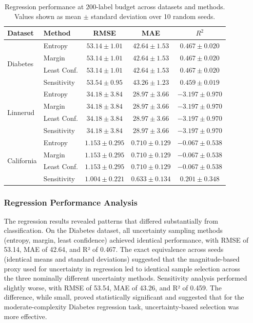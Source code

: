 \documentclass[conference]{IEEEtran}
\begin{document}
\begin{table}[t]
\centering
\caption{Regression performance at 200-label budget across datasets and methods. Values shown as mean $\pm$ standard deviation over 10 random seeds.}
\label{tab:reg-results}
\begin{tabular}{llccc}
\toprule
Dataset & Method & RMSE & MAE & $R^2$ \\
\midrule
\multirow{4}{*}{Diabetes} & Entropy & $53.14 \pm 1.01$ & $42.64 \pm 1.53$ & $0.467 \pm 0.020$ \\
 & Margin & $53.14 \pm 1.01$ & $42.64 \pm 1.53$ & $0.467 \pm 0.020$ \\
 & Least Conf. & $53.14 \pm 1.01$ & $42.64 \pm 1.53$ & $0.467 \pm 0.020$ \\
 & Sensitivity & $53.54 \pm 0.95$ & $43.26 \pm 1.23$ & $0.459 \pm 0.019$ \\
\midrule
\multirow{4}{*}{Linnerud} & Entropy & $34.18 \pm 3.84$ & $28.97 \pm 3.66$ & $-3.197 \pm 0.970$ \\
 & Margin & $34.18 \pm 3.84$ & $28.97 \pm 3.66$ & $-3.197 \pm 0.970$ \\
 & Least Conf. & $34.18 \pm 3.84$ & $28.97 \pm 3.66$ & $-3.197 \pm 0.970$ \\
 & Sensitivity & $34.18 \pm 3.84$ & $28.97 \pm 3.66$ & $-3.197 \pm 0.970$ \\
\midrule
\multirow{4}{*}{California} & Entropy & $1.153 \pm 0.295$ & $0.710 \pm 0.129$ & $-0.067 \pm 0.538$ \\
 & Margin & $1.153 \pm 0.295$ & $0.710 \pm 0.129$ & $-0.067 \pm 0.538$ \\
 & Least Conf. & $1.153 \pm 0.295$ & $0.710 \pm 0.129$ & $-0.067 \pm 0.538$ \\
 & Sensitivity & $\mathbf{1.004 \pm 0.221}$ & $\mathbf{0.633 \pm 0.134}$ & $\mathbf{0.201 \pm 0.348}$ \\
\bottomrule
\end{tabular}
\end{table}

\subsubsection{Regression Performance Analysis}

The regression results revealed patterns that differed substantially from classification. On the Diabetes dataset, all uncertainty sampling methods (entropy, margin, least confidence) achieved identical performance, with RMSE of 53.14, MAE of 42.64, and R² of 0.467. The exact equivalence across seeds (identical means and standard deviations) suggested that the magnitude-based proxy used for uncertainty in regression led to identical sample selection across the three nominally different uncertainty methods. Sensitivity analysis performed slightly worse, with RMSE of 53.54, MAE of 43.26, and R² of 0.459. The difference, while small, proved statistically significant and suggested that for the moderate-complexity Diabetes regression task, uncertainty-based selection was more effective.
\end{document}
